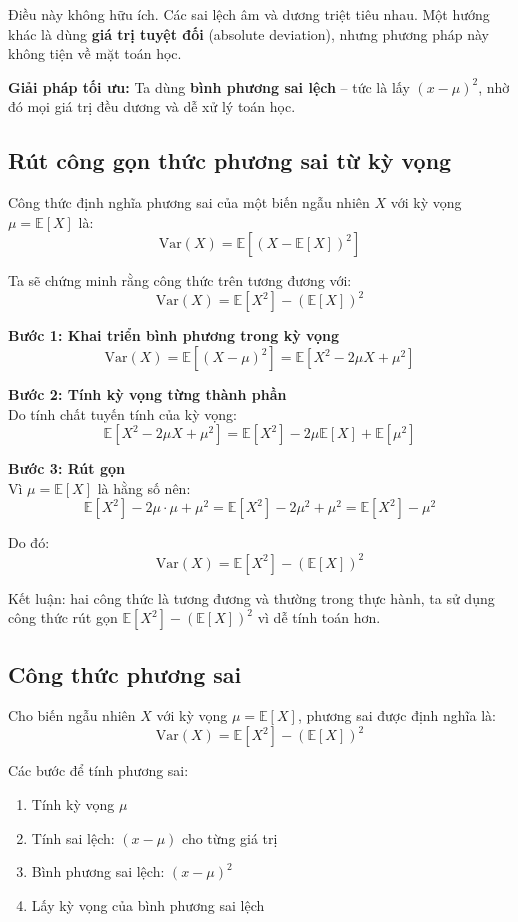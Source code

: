 \documentclass[11pt]{article}
\begin{document}
Điều này không hữu ích. Các sai lệch âm và dương triệt tiêu nhau.  
Một hướng khác là dùng \textbf{giá trị tuyệt đối} (absolute deviation), nhưng phương pháp này không tiện về mặt toán học.

\textbf{Giải pháp tối ưu:} Ta dùng \textbf{bình phương sai lệch} – tức là lấy $(x - \mu)^2$, nhờ đó mọi giá trị đều dương và dễ xử lý toán học.

\vspace{1em}

\subsection{Rút công gọn thức phương sai từ kỳ vọng}

Công thức định nghĩa phương sai của một biến ngẫu nhiên $X$ với kỳ vọng $\mu = \mathbb{E}[X]$ là:
\[
\text{Var}(X) = \mathbb{E}[(X - \mathbb{E}[X])^2]
\]

Ta sẽ chứng minh rằng công thức trên tương đương với:
\[
\text{Var}(X) = \mathbb{E}[X^2] - (\mathbb{E}[X])^2
\]

\textbf{Bước 1: Khai triển bình phương trong kỳ vọng}
\[
\text{Var}(X) = \mathbb{E}\left[(X - \mu)^2\right] = \mathbb{E}\left[X^2 - 2\mu X + \mu^2\right]
\]

\textbf{Bước 2: Tính kỳ vọng từng thành phần} \\
Do tính chất tuyến tính của kỳ vọng:
\[
\mathbb{E}[X^2 - 2\mu X + \mu^2] = \mathbb{E}[X^2] - 2\mu \mathbb{E}[X] + \mathbb{E}[\mu^2]
\]

\textbf{Bước 3: Rút gọn} \\
Vì $\mu = \mathbb{E}[X]$ là hằng số nên:
\[
\mathbb{E}[X^2] - 2\mu \cdot \mu + \mu^2 = \mathbb{E}[X^2] - 2\mu^2 + \mu^2 = \mathbb{E}[X^2] - \mu^2
\]

Do đó:
\[
\text{Var}(X) = \mathbb{E}[X^2] - (\mathbb{E}[X])^2
\]

Kết luận: hai công thức là tương đương và thường trong thực hành, ta sử dụng công thức rút gọn $\mathbb{E}[X^2] - (\mathbb{E}[X])^2$ vì dễ tính toán hơn.


\subsection{Công thức phương sai}

Cho biến ngẫu nhiên $X$ với kỳ vọng $\mu = \mathbb{E}[X]$, phương sai được định nghĩa là:
\[
\text{Var}(X) = \mathbb{E}[X^2] - (\mathbb{E}[X])^2
\]

Các bước để tính phương sai:
\begin{enumerate}
    \item Tính kỳ vọng $\mu$
    \item Tính sai lệch: $(x - \mu)$ cho từng giá trị
    \item Bình phương sai lệch: $(x - \mu)^2$
    \item Lấy kỳ vọng của bình phương sai lệch
\end{enumerate}
\end{document}

